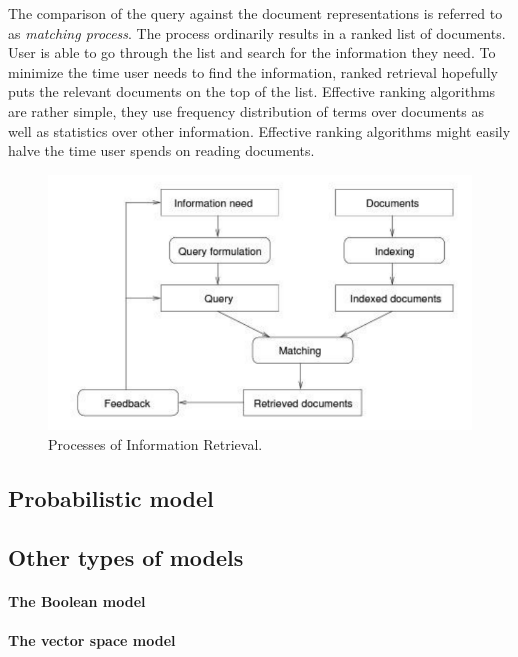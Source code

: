 \documentclass[10pt,twoside,english,a4paper]{article}
\begin{document}
The comparison of the query against the document representations is referred to as \emph{matching process}. The process ordinarily results in a ranked list of documents. User is able to go through the list and search for the information they need. To minimize the time user needs to find the information, ranked retrieval hopefully puts the relevant documents on the top of the list. Effective ranking algorithms are rather simple, they use frequency distribution of terms over documents as well as statistics over other information. Effective ranking algorithms might easily halve the time user spends on reading documents. \cite{hiem09info}

\begin{figure}[tbh]
\centering
\includegraphics[scale=1.0]{irprocess.pdf}
\caption{Processes of Information Retrieval.}
\label{f:process}
\end{figure}

\subsection{Probabilistic model} \label{models:prob}
\cite{hiem09info}
\cite{jones99info}

\subsection{Other types of models} \label{models:other}

\paragraph{The Boolean model}
\cite{hiem09info}

\paragraph{The vector space model}
\cite{hiem09info}
\end{document}
